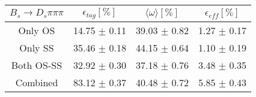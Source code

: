 \begin{tabular}{c c c c}
\hline
\hline
$ B_s \to D_s \pi \pi \pi$ & $\epsilon_{tag} [\%]$ & $\langle \omega \rangle [\%] $ & $\epsilon_{eff} [\%]$ \\
\hline
Only OS & 14.75 $\pm$ 0.11 & 39.03 $\pm$ 0.82 & 1.27 $\pm$ 0.17\\
Only SS & 35.46 $\pm$ 0.18 & 44.15 $\pm$ 0.64 & 1.10 $\pm$ 0.19\\
Both OS-SS & 32.92 $\pm$ 0.30 & 37.18 $\pm$ 0.76 & 3.48 $\pm$ 0.35\\
\hline
Combined & 83.12 $\pm$ 0.37 & 40.48 $\pm$ 0.72 & 5.85 $\pm$ 0.43\\
\hline
\hline
\end{tabular}
